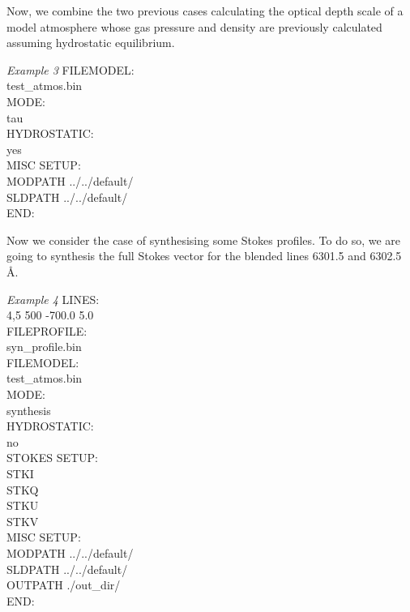 Now, we combine the two previous cases calculating the optical depth scale of a model atmosphere whose gas pressure and density are previously calculated assuming hydrostatic equilibrium.

\begin{ifbox}[label={tb:example03}]{{\it Example 3}}
  \scriptsize
FILEMODEL:\\
test\_atmos.bin\\
MODE:\\
tau\\
HYDROSTATIC:\\
yes\\
MISC SETUP:\\
MODPATH ../../default/\\
SLDPATH ../../default/\\
END:
  \normalsize
\end{ifbox}


%

Now we consider the case of synthesising some Stokes profiles. To do so, we are going to synthesis the full Stokes vector for the blended lines 6301.5 and 6302.5 {\AA}.

\begin{ifbox}[label={tb:example04}]{{\it Example 4}}
  \scriptsize
LINES:\\
4,5 500 -700.0 5.0\\
FILEPROFILE:\\
syn\_profile.bin\\
FILEMODEL:\\
test\_atmos.bin\\
MODE:\\
synthesis\\
HYDROSTATIC:\\
no\\
STOKES SETUP:\\
STKI\\
STKQ\\
STKU\\
STKV\\
MISC SETUP:\\
MODPATH ../../default/\\
SLDPATH ../../default/\\
OUTPATH ./out\_dir/\\
END:
  \normalsize
\end{ifbox}


